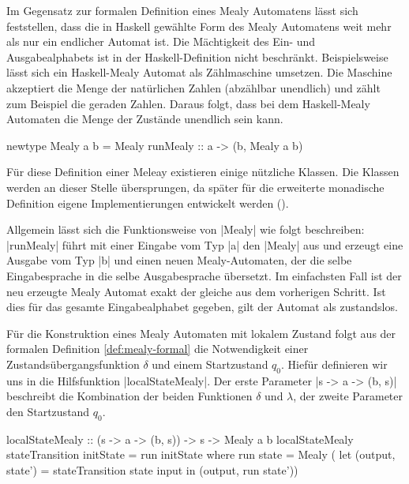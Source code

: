 Im Gegensatz zur formalen Definition eines Mealy Automatens lässt sich feststellen, dass die in Haskell gewählte Form des Mealy Automatens weit mehr als nur ein endlicher Automat ist. Die Mächtigkeit des Ein- und Ausgabealphabets ist in der Haskell-Definition nicht beschränkt. Beispielsweise lässt sich ein Haskell-Mealy Automat als Zählmaschine umsetzen. Die Maschine akzeptiert die Menge der natürlichen Zahlen (abzählbar unendlich) und zählt zum Beispiel die geraden Zahlen. Daraus folgt, dass bei dem Haskell-Mealy Automaten die Menge der Zustände unendlich sein kann.

\begin{haskell}[label={lst:haskell-mealy},caption={[Definition Mealy in Haskell]Definition Mealy in Haskell\protect\footnotemark}]
newtype Mealy a b = Mealy { runMealy :: a -> (b, Mealy a b) }
\end{haskell}

Für diese Definition einer Meleay existieren einige nützliche Klassen. Die Klassen werden an dieser Stelle übersprungen, da 
später für die erweiterte monadische Definition eigene Implementierungen entwickelt werden ().

Allgemein lässt sich die Funktionsweise von |Mealy| wie folgt beschreiben:\\
|runMealy| führt mit einer Eingabe vom Typ |a| den |Mealy| aus und erzeugt eine Ausgabe vom Typ |b| und einen neuen Mealy-Automaten, der die selbe Eingabesprache in die selbe Ausgabesprache übersetzt. Im einfachsten Fall ist der neu erzeugte Mealy Automat exakt der gleiche aus dem vorherigen Schritt. Ist dies für das gesamte Eingabealphabet gegeben, gilt der Automat als zustandslos.

Für die Konstruktion eines Mealy Automaten mit lokalem Zustand folgt aus der formalen Definition \ref{def:mealy-formal} die Notwendigkeit einer Zustandsübergangsfunktion $\delta$ und einem Startzustand $q_0$. Hiefür definieren wir uns in  die Hilfsfunktion |localStateMealy|. Der erste Parameter |s -> a -> (b, s)| beschreibt die Kombination der beiden Funktionen $\delta$ und $\lambda$, der zweite Parameter den Startzustand $q_0$.

\begin{haskell}[label={lst:state-mealy-ctr},caption={[Konstruktion Mealy mit lokalem Zustand]Hilfsfunktion zur Konstruktion eines Mealy-Automatens mit lokalem Zustand}]
localStateMealy :: (s -> a -> (b, s)) -> s -> Mealy a b
localStateMealy stateTransition initState = run initState where
  run state = Mealy ( 
    let (output, state') = stateTransition state input 
    in (output, run state'))
\end{haskell}

